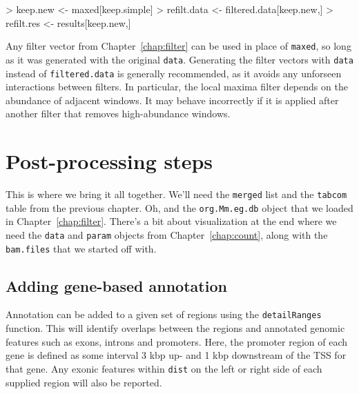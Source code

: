\documentclass[12pt]{report}
\renewenvironment{Schunk}{\vspace{0pt}}{\vspace{0pt}}
\newcommand{\code}[1]{{\small\texttt{#1}}}
\newenvironment{combox}
{ \begin{shaded}\begin{center}\begin{minipage}[t]{0.95\textwidth} }
{ \end{minipage}\end{center}\end{shaded} }
\begin{document}
\begin{Schunk}
\begin{Sinput}
> keep.new <- maxed[keep.simple]
> refilt.data <- filtered.data[keep.new,]
> refilt.res <- results[keep.new,]
\end{Sinput}
\end{Schunk}

Any filter vector from Chapter~\ref{chap:filter} can be used in place of \code{maxed}, so long as it was generated with the original \code{data}.
Generating the filter vectors with \code{data} instead of \code{filtered.data} is generally recommended, as it avoids any unforseen interactions between filters.
In particular, the local maxima filter depends on the abundance of adjacent windows.
It may behave incorrectly if it is applied after another filter that removes high-abundance windows.



\chapter{Post-processing steps}

\begin{combox}
This is where we bring it all together.
We'll need the \code{merged} list and the \code{tabcom} table from the previous chapter. 
Oh, and the \code{org.Mm.eg.db} object that we loaded in Chapter~\ref{chap:filter}.
There's a bit about visualization at the end where we need the \code{data} and \code{param} objects from Chapter~\ref{chap:count}, along with the \code{bam.files} that we started off with.
\end{combox}

\section{Adding gene-based annotation}
Annotation can be added to a given set of regions using the \code{detailRanges} function. 
This will identify overlaps between the regions and annotated genomic features such as exons, introns and promoters. 
Here, the promoter region of each gene is defined as some interval 3 kbp up- and 1 kbp downstream of the TSS for that gene. 
Any exonic features within \code{dist} on the left or right side of each supplied region will also be reported.
\end{document}
